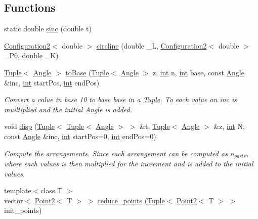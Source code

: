 \subsection*{Functions}
\begin{DoxyCompactItemize}
\item 
static double \mbox{\hyperlink{dubins_8hh_a5c88710b236a514392351a4d13d2e767}{sinc}} (double t)
\item 
\mbox{\hyperlink{class_configuration2}{Configuration2}}$<$ double $>$ \mbox{\hyperlink{dubins_8hh_adef8b363044d7fed558e5b47d8d6a3a0}{circline}} (double \+\_\+L, \mbox{\hyperlink{class_configuration2}{Configuration2}}$<$ double $>$ \+\_\+\+P0, double \+\_\+K)
\item 
\mbox{\hyperlink{class_tuple}{Tuple}}$<$ \mbox{\hyperlink{class_angle}{Angle}} $>$ \mbox{\hyperlink{dubins_8hh_a24a357b93081a0180dfec16136bc8ff7}{to\+Base}} (\mbox{\hyperlink{class_tuple}{Tuple}}$<$ \mbox{\hyperlink{class_angle}{Angle}} $>$ z, \mbox{\hyperlink{draw_8hh_aa620a13339ac3a1177c86edc549fda9b}{int}} n, \mbox{\hyperlink{draw_8hh_aa620a13339ac3a1177c86edc549fda9b}{int}} base, const \mbox{\hyperlink{class_angle}{Angle}} \&inc, \mbox{\hyperlink{draw_8hh_aa620a13339ac3a1177c86edc549fda9b}{int}} start\+Pos, \mbox{\hyperlink{draw_8hh_aa620a13339ac3a1177c86edc549fda9b}{int}} end\+Pos)
\begin{DoxyCompactList}\small\item\em Convert a value in base 10 to base {\ttfamily base} in a {\ttfamily \mbox{\hyperlink{class_tuple}{Tuple}}}. To each value an inc is muiltiplied and the initial {\ttfamily \mbox{\hyperlink{class_angle}{Angle}}} is added. \end{DoxyCompactList}\item 
void \mbox{\hyperlink{dubins_8hh_a16cf89e561eae9ea10a39e40432af238}{disp}} (\mbox{\hyperlink{class_tuple}{Tuple}}$<$ \mbox{\hyperlink{class_tuple}{Tuple}}$<$ \mbox{\hyperlink{class_angle}{Angle}} $>$ $>$ \&t, \mbox{\hyperlink{class_tuple}{Tuple}}$<$ \mbox{\hyperlink{class_angle}{Angle}} $>$ \&z, \mbox{\hyperlink{draw_8hh_aa620a13339ac3a1177c86edc549fda9b}{int}} N, const \mbox{\hyperlink{class_angle}{Angle}} \&inc, \mbox{\hyperlink{draw_8hh_aa620a13339ac3a1177c86edc549fda9b}{int}} start\+Pos=0, \mbox{\hyperlink{draw_8hh_aa620a13339ac3a1177c86edc549fda9b}{int}} end\+Pos=0)
\begin{DoxyCompactList}\small\item\em Compute the arrangements. Since each arrangement can be computed as $n_{parts}$, where each values is then multiplied for the increment and is added to the initial values. \end{DoxyCompactList}\item 
{\footnotesize template$<$class T $>$ }\\vector$<$ \mbox{\hyperlink{class_point2}{Point2}}$<$ T $>$ $>$ \mbox{\hyperlink{dubins_8hh_afa53a085a4bb61c12f09c88a5f583dbd}{reduce\+\_\+points}} (\mbox{\hyperlink{class_tuple}{Tuple}}$<$ \mbox{\hyperlink{class_point2}{Point2}}$<$ T $>$ $>$ init\+\_\+points)
\end{DoxyCompactItemize}
